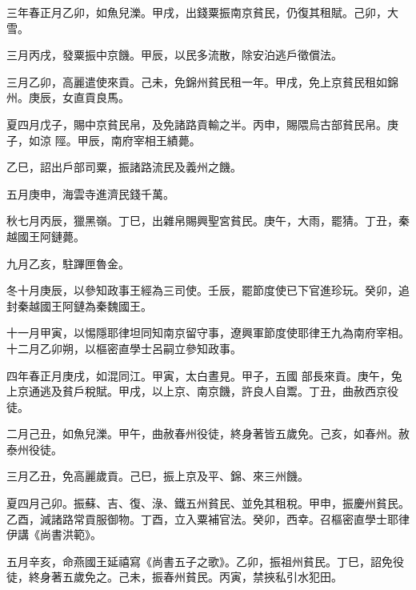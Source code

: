 
\begin{pinyinscope}

 三年春正月乙卯，如魚兒濼。甲戌，出錢粟振南京貧民，仍復其租賦。己卯，大雪。



 三月丙戌，發粟振中京饑。甲辰，以民多流散，除安泊逃戶徵償法。



 三月乙卯，高麗遣使來貢。己未，免錦州貧民租一年。甲戌，免上京貧民租如錦州。庚辰，女直貢良馬。



 夏四月戊子，賜中京貧民帛，及免諸路貢輸之半。丙申，賜隈烏古部貧民帛。庚子，如涼
 陘。甲辰，南府宰相王績薨。



 乙巳，詔出戶部司粟，振諸路流民及義州之饑。



 五月庚申，海雲寺進濟民錢千萬。



 秋七月丙辰，獵黑嶺。丁巳，出雜帛賜興聖宮貧民。庚午，大雨，罷猜。丁丑，秦越國王阿鏈薨。



 九月乙亥，駐蹕匣魯金。



 冬十月庚辰，以參知政事王經為三司使。壬辰，罷節度使已下官進珍玩。癸卯，追封秦越國王阿鏈為秦魏國王。



 十一月甲寅，以惕隱耶律坦同知南京留守事，遼興軍節度使耶律王九為南府宰相。十二月乙卯朔，以樞密直學士呂嗣立參知政事。



 四年春正月庚戌，如混同江。甲寅，太白晝見。甲子，五國
 部長來貢。庚午，兔上京通逃及貧戶稅賦。甲戌，以上京、南京饑，許良人自鬻。丁丑，曲赦西京役徒。



 二月己丑，如魚兒濼。甲午，曲赦春州役徒，終身著皆五歲免。己亥，如春州。赦泰州役徒。



 三月乙丑，免高麗歲貢。己巳，振上京及平、錦、來三州饑。



 夏四月己卯。振蘇、吉、復、淥、鐵五州貧民、並免其租稅。甲申，振慶州貧民。乙酉，減諸路常貢服御物。丁酉，立入粟補官法。癸卯，西幸。召樞密直學士耶律伊講《尚書洪範》。



 五月辛亥，命燕國王延禧寫《尚書五子之歌》。乙卯，振祖州貧民。丁巳，詔免役徒，終身著五歲免之。己未，振春州貧民。丙寅，禁挾私引水犯田。




\end{pinyinscope}
